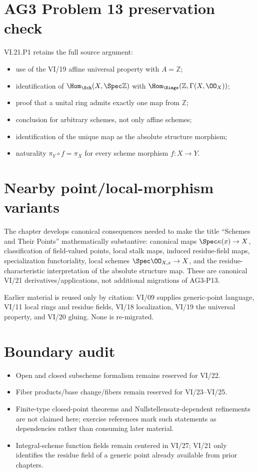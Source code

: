 \section*{AG3 Problem 13 preservation check}
VI.21.P1 retains the full source argument:
\begin{itemize}
\item use of the VI/19 affine universal property with $A=\mathbb Z$;
\item identification of $\Hom_{\Sch}(X,\Spec\mathbb Z)$ with
$\Hom_{\Rings}(\mathbb Z,\Gamma(X,\OO_X))$;
\item proof that a unital ring admits exactly one map from $\mathbb Z$;
\item conclusion for arbitrary schemes, not only affine schemes;
\item identification of the unique map as the absolute structure morphism;
\item naturality $\pi_Y\circ f=\pi_X$ for every scheme morphism $f:X\to Y$.
\end{itemize}

\section*{Nearby point/local-morphism variants}
The chapter develops canonical consequences needed to make the title ``Schemes and Their Points''
mathematically substantive: canonical maps $\Spec\kappa(x)\to X$, classification of field-valued
points, local stalk maps, induced residue-field maps, specialization functoriality, local schemes
$\Spec\OO_{X,x}\to X$, and the residue-characteristic interpretation of the absolute structure map.
These are canonical VI/21 derivatives/applications, not additional migrations of AG3-P13.

Earlier material is reused only by citation: VI/09 supplies generic-point language, VI/11 local rings
and residue fields, VI/18 localization, VI/19 the universal property, and VI/20 gluing.  None is
re-migrated.

\section*{Boundary audit}
\begin{itemize}
\item Open and closed subscheme formalism remains reserved for VI/22.
\item Fiber products/base change/fibers remain reserved for VI/23--VI/25.
\item Finite-type closed-point theorems and Nullstellensatz-dependent refinements are not claimed here;
exercise references mark such statements as dependencies rather than consuming later material.
\item Integral-scheme function fields remain centered in VI/27; VI/21 only identifies the residue
field of a generic point already available from prior chapters.
\end{itemize}

